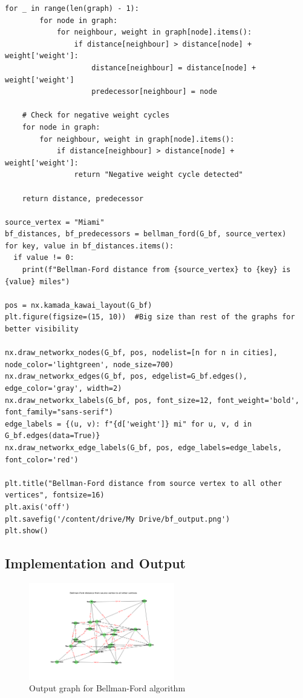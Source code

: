 \documentclass[lettersize,journal]{IEEEtran}
\begin{document}
\begin{lstlisting}[caption={Bellman-Ford Algorithm}]
    for _ in range(len(graph) - 1):
        for node in graph:
            for neighbour, weight in graph[node].items():
                if distance[neighbour] > distance[node] + weight['weight']:
                    distance[neighbour] = distance[node] + weight['weight']
                    predecessor[neighbour] = node

    # Check for negative weight cycles
    for node in graph:
        for neighbour, weight in graph[node].items():
            if distance[neighbour] > distance[node] + weight['weight']:
                return "Negative weight cycle detected"

    return distance, predecessor

source_vertex = "Miami"
bf_distances, bf_predecessors = bellman_ford(G_bf, source_vertex)
for key, value in bf_distances.items():
  if value != 0:
    print(f"Bellman-Ford distance from {source_vertex} to {key} is {value} miles")

pos = nx.kamada_kawai_layout(G_bf)
plt.figure(figsize=(15, 10))  #Big size than rest of the graphs for better visibility

nx.draw_networkx_nodes(G_bf, pos, nodelist=[n for n in cities], node_color='lightgreen', node_size=700)
nx.draw_networkx_edges(G_bf, pos, edgelist=G_bf.edges(), edge_color='gray', width=2)
nx.draw_networkx_labels(G_bf, pos, font_size=12, font_weight='bold', font_family="sans-serif")
edge_labels = {(u, v): f"{d['weight']} mi" for u, v, d in G_bf.edges(data=True)}
nx.draw_networkx_edge_labels(G_bf, pos, edge_labels=edge_labels, font_color='red')

plt.title("Bellman-Ford distance from source vertex to all other vertices", fontsize=16)
plt.axis('off')
plt.savefig('/content/drive/My Drive/bf_output.png')
plt.show()

\end{lstlisting}

\subsection{Implementation and Output}

\begin{figure}[!t]
\centering
\includegraphics[width=2.5in]{bf_output.png}
\caption{Output graph for Bellman-Ford algorithm}
\label{fig_6}
\end{figure}
\end{document}
